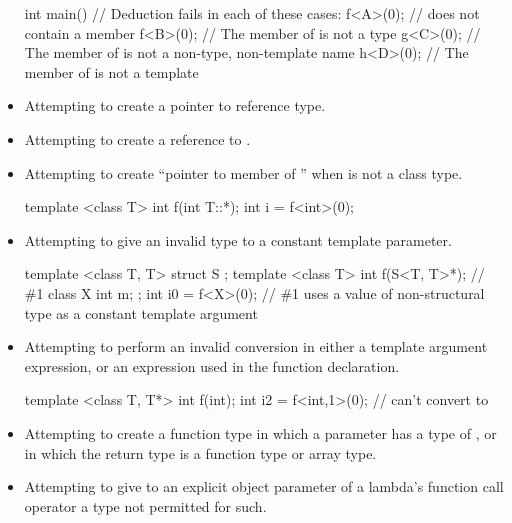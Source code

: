 \begin{note}
\begin{itemize}
\begin{example}
\begin{codeblock}
int main() {
  // Deduction fails in each of these cases:
  f<A>(0);          //  does not contain a member 
  f<B>(0);          // The  member of  is not a type
  g<C>(0);          // The  member of  is not a non-type, non-template name
  h<D>(0);          // The  member of  is not a template
}
\end{codeblock}
\end{example}
\item
Attempting to create a pointer to reference type.
\item
Attempting to create a reference to .
\item
Attempting to create ``pointer to member of '' when  is not a
class type.
\begin{example}
\begin{codeblock}
template <class T> int f(int T::*);
int i = f<int>(0);
\end{codeblock}
\end{example}
\item
Attempting to give an invalid type to a constant template parameter.
\begin{example}
\begin{codeblock}
template <class T, T> struct S {};
template <class T> int f(S<T, T{}>*);   // \#1
class X {
  int m;
};
int i0 = f<X>(0);   // \#1 uses a value of non-structural type  as a constant template argument
\end{codeblock}
\end{example}

\item
Attempting to perform an invalid conversion in either a template
argument expression, or an expression used in the function
declaration.
\begin{example}
\begin{codeblock}
template <class T, T*> int f(int);
int i2 = f<int,1>(0);           // can't convert  to 
\end{codeblock}
\end{example}

\item
Attempting to create a function type in which a parameter has a type
of , or in which the return type is a function type
or array type.

\item
Attempting to give to
an explicit object parameter of a lambda's function call operator
a type not permitted for such.
\end{itemize}
\end{note}

